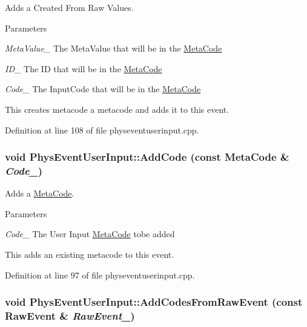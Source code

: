 Adds a Created From Raw Values. 
\begin{DoxyParams}{Parameters}
\item[{\em MetaValue\_\-}]The MetaValue that will be in the \hyperlink{classMetaCode}{MetaCode} \item[{\em ID\_\-}]The ID that will be in the \hyperlink{classMetaCode}{MetaCode} \item[{\em Code\_\-}]The InputCode that will be in the \hyperlink{classMetaCode}{MetaCode}\end{DoxyParams}
This creates metacode a metacode and adds it to this event. 

Definition at line 108 of file physeventuserinput.cpp.\hypertarget{classPhysEventUserInput_a4f5b94c64cd08c15b480e441d25a385d}{
\subsubsection[{AddCode}]{\setlength{\rightskip}{0pt plus 5cm}void PhysEventUserInput::AddCode (const {\bf MetaCode} \& {\em Code\_\-})}}
\label{dc/d0e/classPhysEventUserInput_a4f5b94c64cd08c15b480e441d25a385d}


Adds a \hyperlink{classMetaCode}{MetaCode}. 
\begin{DoxyParams}{Parameters}
\item[{\em Code\_\-}]The User Input \hyperlink{classMetaCode}{MetaCode} tobe added\end{DoxyParams}
This adds an existing metacode to this event. 

Definition at line 97 of file physeventuserinput.cpp.\hypertarget{classPhysEventUserInput_a9e42f42f9a4a42f792e5cf95856669c0}{
\subsubsection[{AddCodesFromRawEvent}]{\setlength{\rightskip}{0pt plus 5cm}void PhysEventUserInput::AddCodesFromRawEvent (const RawEvent \& {\em RawEvent\_\-})}}
\label{dc/d0e/classPhysEventUserInput_a9e42f42f9a4a42f792e5cf95856669c0}


